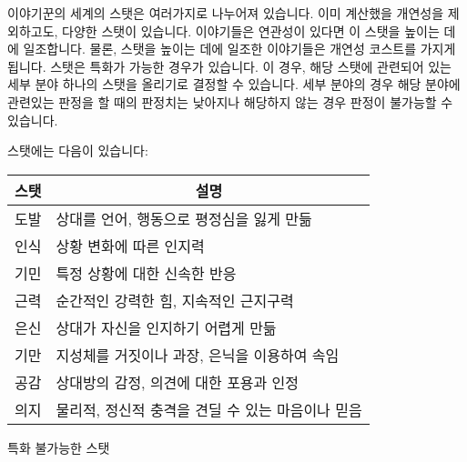 \documentclass{report}
\begin{document}
	이야기꾼의 세계의 스탯은 여러가지로 나누어져 있습니다. 이미 계산했을 개연성을 제외하고도, 다양한 스탯이 있습니다. 이야기들은 연관성이 있다면 이 스탯을 높이는 데에 일조합니다. 물론, 스탯을 높이는 데에 일조한 이야기들은 개연성 코스트를 가지게 됩니다.
	스탯은 특화가 가능한 경우가 있습니다. 이 경우, 해당 스탯에 관련되어 있는 세부 분야 하나의 스탯을 올리기로 결정할 수 있습니다. 세부 분야의 경우 해당 분야에 관련있는 판정을 할 때의 판정치는 낮아지나 해당하지 않는 경우 판정이 불가능할 수 있습니다.
	
	스탯에는 다음이 있습니다:
	
	\smallskip
	
	\begin{minipage}{\textwidth}
		\begin{tabularx}{\textwidth}{c|X}
			\hline
			\textbf{스탯} & \multicolumn{1}{c|}{\textbf{설명}}\\ \hline \hline
			도발          & 상대를 언어, 행동으로 평정심을 잃게 만듦\\\hline
			인식          & 상황 변화에 따른 인지력          \\\hline
			기민          & 특정 상황에 대한 신속한 반응       \\\hline
			근력          & 순간적인 강력한 힘, 지속적인 근지구력  \\\hline
			은신          & 상대가 자신을 인지하기 어렵게 만듦    \\\hline
			기만          & 지성체를 거짓이나 과장, 은닉을 이용하여 속임 \\\hline
			공감          & 상대방의 감정, 의견에 대한 포용과 인정 \\\hline
			의지          & 물리적, 정신적 충격을 견딜 수 있는 마음이나 믿음\\\hline
		\end{tabularx}
		
		\begin{center}
			특화 불가능한 스탯
		\end{center}
	\end{minipage}
	
\end{document}
